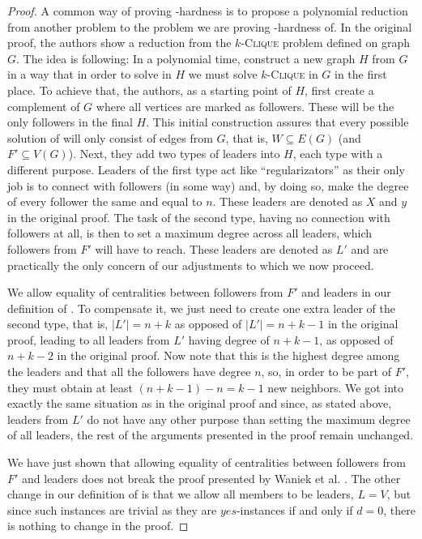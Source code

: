 \begin{proof}
    A common way of proving \NP-hardness is to propose a polynomial reduction from another \NPh problem to the
    problem we are proving \NP-hardness of.
    In the original proof, the authors show a reduction from the $k$-\textsc{Clique} problem defined on graph $G$.
    The idea is following: In a polynomial time, construct a new graph $H$ from $G$ in a way that
    in order to solve \HL in $H$ we must solve $k$-\textsc{Clique} in $G$ in the first place.
    To achieve that, the authors, as a starting point of $H$, first create a complement of $G$ 
    where all vertices are marked as followers. These will be the only followers in the final $H$.
    This initial construction assures that every possible solution of \HLshort will only consist of edges from $G$, that is,
    $W \subseteq E(G)$ (and $F' \subseteq V(G)$).
    Next, they add two types of leaders into $H$, each type with a different purpose.
    Leaders of the first type act like ``regularizators'' as their only job is to connect with followers (in some way) and,
    by doing so, make the degree of every follower the same and equal to $n$.
    These leaders are denoted as $X$ and $y$ in the original proof.
    The task of the second type, having no connection with followers at all,
    is then to set a maximum degree across all leaders, which followers from $F'$ will have to reach.
    These leaders are denoted as $L'$ and are practically the only concern of our adjustments to which we now proceed.

    We allow equality of centralities between followers from $F'$ and leaders in our definition of \HL.
    To compensate it, we just need to create one extra leader of the second type, that is,
    $|L'| = n+k$ as opposed of $|L'| = n+k-1$ in the original proof,
    leading to all leaders from $L'$ having degree of $n+k-1$, as opposed of $n+k-2$ in the original proof.
    Now note that this is the highest degree among the leaders and that all the followers have degree $n$,
    so, in order to be part of $F'$, they must obtain at least $(n+k-1) - n = k-1$ new neighbors.
    We got into exactly the same situation as in the original proof and since, as stated above,
    leaders from $L'$ do not have any other purpose than setting the maximum degree of all leaders,
    the rest of the arguments presented in the proof remain unchanged.

    We have just shown that allowing equality of centralities between followers from $F'$ and leaders does not
    break the proof presented by Waniek et al. \cite{Waniek2017}.
    The other change in our definition of \HL is that we allow all members to be leaders, $L = V$,
    but since such instances are trivial as they are $yes$-instances if and only if $d = 0$,
    there is nothing to change in the proof.
\end{proof}


